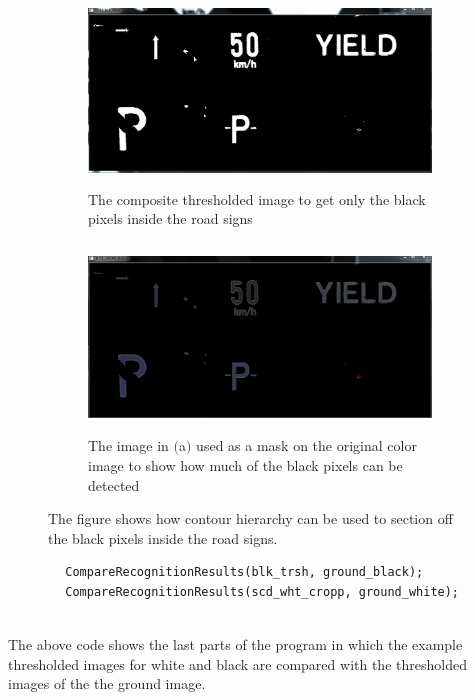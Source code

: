 \documentclass{article}
\begin{document}
\begin{figure}[H]
\begin{subfigure}{0.5\textwidth}
\includegraphics[width=0.9\linewidth, height=5cm]{N_BLK_TRSH.PNG} 
\caption{The composite thresholded image to get only the black pixels inside the road signs}
\label{fig:subim1}
\end{subfigure}
\begin{subfigure}{0.5\textwidth}
\includegraphics[width=0.9\linewidth, height=5cm]{N_BLK_CROPP.PNG}
\caption{The image in $($a$)$ used as a mask on the original color image to show how much of the black pixels can be detected}
\label{fig:subim2}
\end{subfigure}
\caption{The figure shows how contour hierarchy can be used to section off the black pixels inside the road signs.}
\label{fig:image2}
\end{figure}

\begin{lstlisting}
		CompareRecognitionResults(blk_trsh, ground_black);
		CompareRecognitionResults(scd_wht_cropp, ground_white);
		
\end{lstlisting}
The above code shows the last parts of the program in which the example thresholded images for white and black are compared with the thresholded images of the the ground image.
\end{document}
